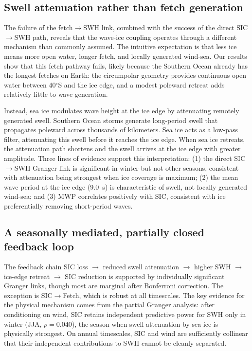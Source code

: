 \documentclass[11pt]{article}
\begin{document}
\subsection{Swell attenuation rather than fetch generation}

The failure of the fetch$\to$SWH link, combined with the success of the direct SIC$\to$SWH path, reveals that the wave-ice coupling operates through a different mechanism than commonly assumed. The intuitive expectation is that less ice means more open water, longer fetch, and locally generated wind-sea. Our results show that this fetch pathway fails, likely because the Southern Ocean already has the longest fetches on Earth: the circumpolar geometry provides continuous open water between 40$^\circ$S and the ice edge, and a modest poleward retreat adds relatively little to wave generation.

Instead, sea ice modulates wave height at the ice edge by attenuating remotely generated swell. Southern Ocean storms generate long-period swell that propagates poleward across thousands of kilometers\cite{Kohout2014}. Sea ice acts as a low-pass filter, attenuating this swell before it reaches the ice edge\cite{Squire2020}. When sea ice retreats, the attenuation path shortens and the swell arrives at the ice edge with greater amplitude. Three lines of evidence support this interpretation: (1) the direct SIC$\to$SWH Granger link is significant in winter but not other seasons, consistent with attenuation being strongest when ice coverage is maximum; (2) the mean wave period at the ice edge (9.0~s) is characteristic of swell, not locally generated wind-sea; and (3) MWP correlates positively with SIC, consistent with ice preferentially removing short-period waves.

\subsection{A seasonally mediated, partially closed feedback loop}

The feedback chain SIC loss $\to$ reduced swell attenuation $\to$ higher SWH $\to$ ice-edge retreat $\to$ SIC reduction is supported by individually significant Granger links, though most are marginal after Bonferroni correction. The exception is SIC$\to$Fetch, which is robust at all timescales. The key evidence for the physical mechanism comes from the partial Granger analysis: after conditioning on wind, SIC retains independent predictive power for SWH only in winter (JJA, $p = 0.040$), the season when swell attenuation by sea ice is physically strongest. On annual timescales, SIC and wind are sufficiently collinear that their independent contributions to SWH cannot be cleanly separated.
\end{document}
